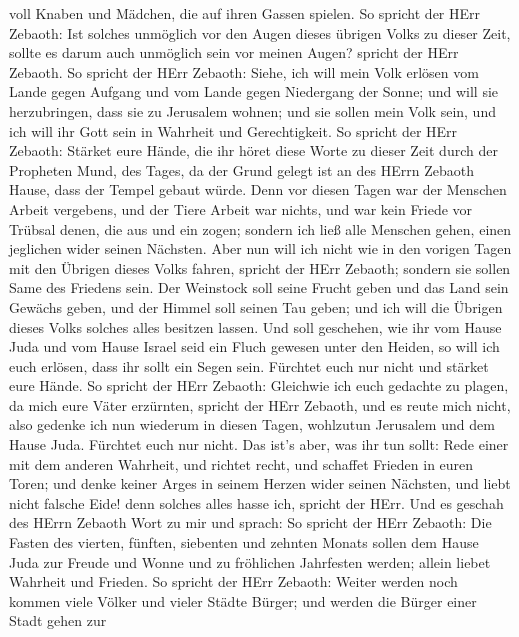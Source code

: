 voll Knaben und Mädchen, die auf ihren Gassen spielen.  So
spricht der HErr Zebaoth: Ist solches unmöglich vor den Augen dieses
übrigen Volks zu dieser Zeit, sollte es darum auch unmöglich sein vor
meinen Augen? spricht der HErr Zebaoth.  So spricht der HErr
Zebaoth: Siehe, ich will mein Volk erlösen vom Lande gegen Aufgang und
vom Lande gegen Niedergang der Sonne;  und will sie
herzubringen, dass sie zu Jerusalem wohnen; und sie sollen mein Volk
sein, und ich will ihr Gott sein in Wahrheit und Gerechtigkeit.
 So spricht der HErr Zebaoth: Stärket eure Hände, die ihr
höret diese Worte zu dieser Zeit durch der Propheten Mund, des Tages, da
der Grund gelegt ist an des HErrn Zebaoth Hause, dass der Tempel gebaut
würde.  Denn vor diesen Tagen war der Menschen Arbeit
vergebens, und der Tiere Arbeit war nichts, und war kein Friede vor
Trübsal denen, die aus und ein zogen; sondern ich ließ alle Menschen
gehen, einen jeglichen wider seinen Nächsten.  Aber nun
will ich nicht wie in den vorigen Tagen mit den Übrigen dieses Volks
fahren, spricht der HErr Zebaoth;  sondern sie sollen Same
des Friedens sein. Der Weinstock soll seine Frucht geben und das Land
sein Gewächs geben, und der Himmel soll seinen Tau geben; und ich will
die Übrigen dieses Volks solches alles besitzen lassen. 
Und soll geschehen, wie ihr vom Hause Juda und vom Hause Israel seid ein
Fluch gewesen unter den Heiden, so will ich euch erlösen, dass ihr sollt
ein Segen sein. Fürchtet euch nur nicht und stärket eure Hände.
 So spricht der HErr Zebaoth: Gleichwie ich euch gedachte
zu plagen, da mich eure Väter erzürnten, spricht der HErr Zebaoth, und
es reute mich nicht,  also gedenke ich nun wiederum in
diesen Tagen, wohlzutun Jerusalem und dem Hause Juda. Fürchtet euch nur
nicht.  Das ist's aber, was ihr tun sollt: Rede einer mit
dem anderen Wahrheit, und richtet recht, und schaffet Frieden in euren
Toren;  und denke keiner Arges in seinem Herzen wider
seinen Nächsten, und liebt nicht falsche Eide! denn solches alles hasse
ich, spricht der HErr.  Und es geschah des HErrn Zebaoth
Wort zu mir und sprach:  So spricht der HErr Zebaoth: Die
Fasten des vierten, fünften, siebenten und zehnten Monats sollen dem
Hause Juda zur Freude und Wonne und zu fröhlichen Jahrfesten werden;
allein liebet Wahrheit und Frieden.  So spricht der HErr
Zebaoth: Weiter werden noch kommen viele Völker und vieler Städte
Bürger;  und werden die Bürger einer Stadt gehen zur
